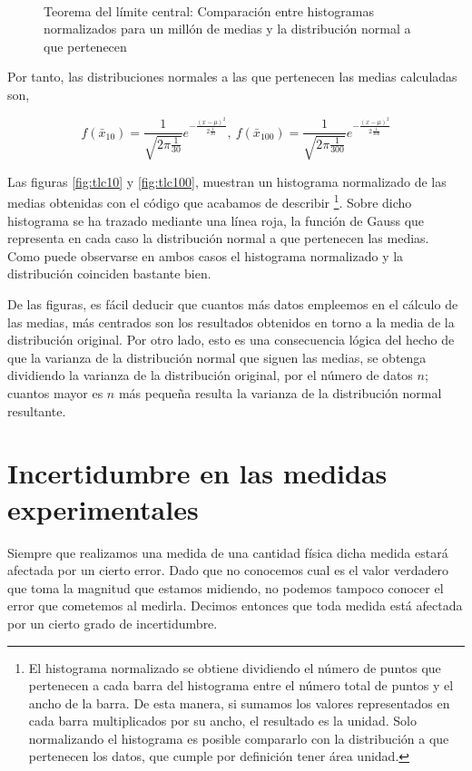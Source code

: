 \begin{figure}
\centering
{} \qquad 
{}\\
\caption{Teorema del límite central: Comparación entre histogramas normalizados para un millón de medias y la distribución normal a que pertenecen}
\end{figure}

Por tanto, las distribuciones normales a las que pertenecen las medias calculadas son,


\begin{equation*}
f(\bar{x}_{10})=\frac{1}{\sqrt{2\pi\frac{1}{30}}}e^{-\frac{(x-\mu)^2}{2\frac{1}{30}}},\  f(\bar{x}_{100})=\frac{1}{\sqrt{2\pi\frac{1}{300}}}e^{-\frac{(x-\mu)^2}{2\frac{1}{300}}}
\end{equation*}

Las figuras \ref{fig:tlc10} y \ref{fig:tlc100}, muestran un histograma normalizado de las medias obtenidas con el código que acabamos de describir \footnote{El histograma normalizado se obtiene dividiendo el número de puntos que pertenecen a cada barra del histograma entre el número total de puntos y el ancho de la barra. De esta manera, si sumamos los valores representados en cada barra multiplicados por su ancho, el resultado es la unidad. Solo normalizando el histograma es posible compararlo con la distribución a que pertenecen los datos, que cumple por definición tener área unidad.}. Sobre dicho histograma se ha trazado mediante una línea roja, la función de Gauss que representa en cada caso la distribución normal a que pertenecen las medias. Como puede observarse en ambos casos el histograma normalizado y la distribución coinciden bastante bien.

De las figuras, es fácil deducir que cuantos más datos empleemos en el cálculo de las medias, más centrados son los resultados obtenidos en torno a la media de la distribución original. Por otro lado, esto es una consecuencia lógica del hecho de que la varianza de la distribución normal que siguen las medias, se obtenga dividiendo la varianza de la distribución original, por el número de datos $n$; cuantos mayor es $n$ más pequeña resulta la varianza de la distribución normal resultante.
 
\section{Incertidumbre en las medidas experimentales}
Siempre que realizamos una medida de una cantidad física dicha medida  estará afectada por un cierto error. Dado que no conocemos cual es el valor verdadero que toma la magnitud que estamos midiendo, no podemos tampoco conocer el error que cometemos al medirla. Decimos entonces que toda medida está afectada por un cierto grado de incertidumbre.

